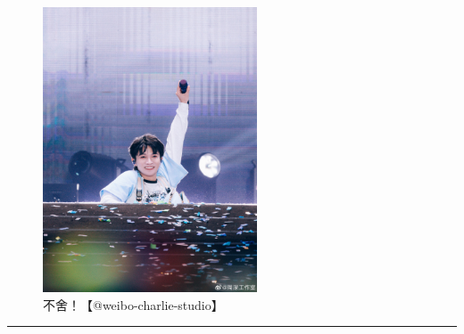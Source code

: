 \documentclass[]{ctexbook}
\begin{document}
\begin{figure}

{\centering \includegraphics[width=180pt]{img/suzhou20241110/003} 

}

\caption{不舍！【@weibo-charlie-studio】}\label{fig:unnamed-chunk-124}
\end{figure}

\begin{center}\rule{0.5\linewidth}{0.5pt}\end{center}
\end{document}

